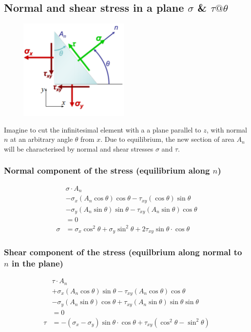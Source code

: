 \documentclass[class=report, crop=false, 12pt,a4paper]{standalone}
\begin{document}
\subsection{Normal and shear stress in a plane $\sigma$ \& $\tau @ \theta$}
\begin{figure}[H]
    \centering
    \includegraphics[height = 5cm]{../img/diagram44.png}
    \caption{}
\end{figure}
Imagine to cut the infinitesimal element with a a plane parallel to $z$, with normal $n$ at an arbitrary angle $\theta$ from $x$. Due to equilibrium, the new section of area $A_n$ will be characterised by normal and shear stresses $\sigma$ and $\tau$. 
\subsubsection{Normal component of the stress (equilibrium along $n$)}
\begin{align}
    &\sigma \cdot A_n\\
    &-\sigma_x \left(A_n \cos \theta\right)\cos\theta - \tau_{xy} \left(\cos\theta\right)\sin\theta\\
    &-\sigma_y \left(A_n\sin\theta\right)\sin\theta - \tau_{xy}\left(A_n\sin\theta\right)\cos\theta\\
    &=0\\
    \sigma &= \sigma_x \cos^2 \theta + \sigma_y \sin^2 \theta + 2\tau_{xy} \sin\theta \cdot \cos\theta
\end{align}
\subsubsection{Shear component of the stress (equilbrium along normal to $n$ in the plane)}
\begin{align}
    &\tau \cdot A_n\\
    &+\sigma_x \left(A_n\cos\theta\right)\sin\theta - \tau_{xy}\left(A_n\cos\theta\right)\cos\theta\\
    &-\sigma_y \left(A_n\sin\theta\right)\cos\theta + \tau_{xy}\left(A_n\sin\theta\right)\sin\theta\sin\theta\\
    &=0\\
    \tau &= - \left(\sigma_x - \sigma_y\right)\sin\theta \cdot \cos\theta + \tau_{xy}\left(\cos^2\theta-\sin^2\theta\right)
\end{align}
\end{document}
